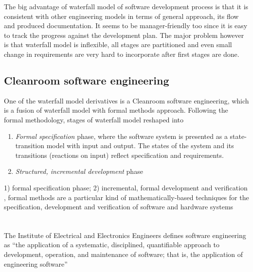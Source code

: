 The big advantage of waterfall model of software development process is that 
it is consistent with other engineering models in terms of general approach, 
its flow and produced documentation. It seems to be manager-friendly too since
it is easy to track the progress against the development plan. The major 
problem however is that waterfall model is inflexible, all stages are 
partitioned and even small change in requirements are very hard to incorporate 
after first stages are done.

\subsection{Cleanroom software engineering}
One of the waterfall model derivatives is a Cleanroom software engineering, which is
a fusion of waterfall model with formal methods approach. 
Following the formal methodology, stages of waterfall model reshaped into 
\begin{enumerate}
 \item \textit{Formal specification} phase, where the software system is presented as 
a state-transition model with input and output. The states of the system and
its transitions (reactions on input) reflect specification and requirements.
 \item \textit{Structured, incremental development} phase 
\end{enumerate}

1) formal specification phase; 2) incremental, formal development and verification 
, formal methods are a particular kind of mathematically-based techniques for
the specification, development and verification of software and hardware systems

\section{}

The Institute of Electrical and Electronics Engineers defines software engineering as 
“the application of a systematic, disciplined, quantifiable approach to development, 
operation, and maintenance of software; that is, the application of engineering software”
